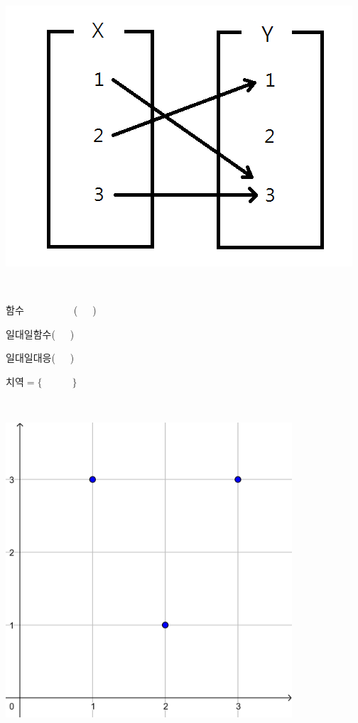 \documentclass[a4paper]{oblivoir}
\begin{document}
%
\begin{minipage}{0.4\textwidth}
\includegraphics[width=\textwidth]{function}
\end{minipage}
~
\begin{minipage}{0.20\textwidth}
함수~~~~~~~~~~(~~~)\par\bigskip
일대일함수(~~~)\par\bigskip
일대일대응(~~~)\par\bigskip
치역\(=\{\qquad\quad\}\)
\end{minipage}
~
\begin{minipage}{0.35\textwidth}
\includegraphics[width=0.8\textwidth]{function-}
\end{minipage}
\end{document}
